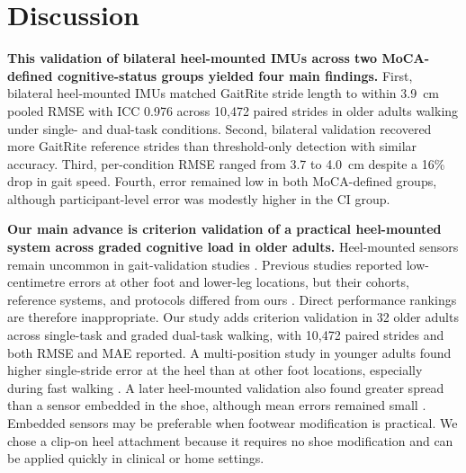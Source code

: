 \documentclass[11pt]{article}
\begin{document}

\clearpage
\section{Discussion}

\textbf{This validation of bilateral heel-mounted IMUs across two MoCA-defined cognitive-status groups yielded four main findings.}
First, bilateral heel-mounted IMUs matched GaitRite stride length to within 3.9~cm pooled RMSE with ICC 0.976 across 10{,}472 paired strides in older adults walking under single- and dual-task conditions. Second, bilateral validation recovered more GaitRite reference strides than threshold-only detection with similar accuracy. Third, per-condition RMSE ranged from 3.7 to 4.0~cm despite a 16\% drop in gait speed. Fourth, error remained low in both MoCA-defined groups, although participant-level error was modestly higher in the CI group.

\textbf{Our main advance is criterion validation of a practical heel-mounted system across graded cognitive load in older adults.} Heel-mounted sensors remain uncommon in gait-validation studies \citep{Lin2025, Kuderle2022}. Previous studies reported low-centimetre errors at other foot and lower-leg locations, but their cohorts, reference systems, and protocols differed from ours \citep{Mariani2010, Trojaniello2014, Laidig2021, Rampp2015}. Direct performance rankings are therefore inappropriate. Our study adds criterion validation in 32 older adults across single-task and graded dual-task walking, with 10{,}472 paired strides and both RMSE and MAE reported. A multi-position study in younger adults found higher single-stride error at the heel than at other foot locations, especially during fast walking \citep{Kuderle2022}. A later heel-mounted validation also found greater spread than a sensor embedded in the shoe, although mean errors remained small \citep{Luo2024}. Embedded sensors may be preferable when footwear modification is practical. We chose a clip-on heel attachment because it requires no shoe modification and can be applied quickly in clinical or home settings.
\end{document}
